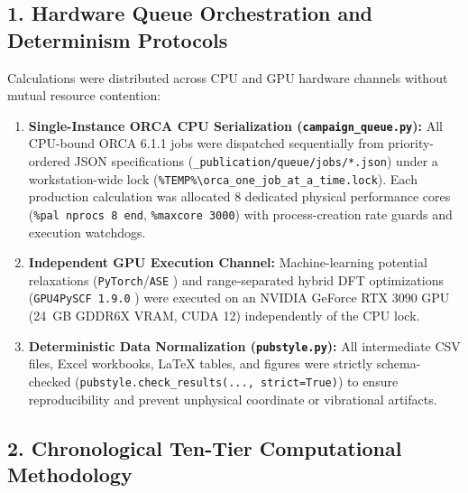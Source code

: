 \documentclass[journal=jpclcd,manuscript=article]{achemso}
\begin{document}
\subsection{1. Hardware Queue Orchestration and Determinism Protocols}
Calculations were distributed across CPU and GPU hardware channels without mutual resource contention:
\begin{enumerate}
  \item \textbf{Single-Instance ORCA CPU Serialization (\texttt{campaign\_queue.py}):} All CPU-bound ORCA 6.1.1 \cite{Neese2020, Neese2022} jobs were dispatched sequentially from priority-ordered JSON specifications (\texttt{\_publication/queue/jobs/*.json}) under a workstation-wide lock (\texttt{\%TEMP\%\textbackslash orca\_one\_job\_at\_a\_time.lock}). Each production calculation was allocated 8 dedicated physical performance cores (\texttt{\%pal nprocs 8 end}, \texttt{\%maxcore 3000}) with process-creation rate guards and execution watchdogs.
  \item \textbf{Independent GPU Execution Channel:} Machine-learning potential relaxations (\texttt{PyTorch}/\texttt{ASE} \cite{Larsen2017}) and range-separated hybrid DFT optimizations (\texttt{GPU4PySCF 1.9.0} \cite{Sun2018, Sun2020, Wu2024, Li2024}) were executed on an NVIDIA GeForce RTX 3090 GPU (24~GB GDDR6X VRAM, CUDA 12) independently of the CPU lock.
  \item \textbf{Deterministic Data Normalization (\texttt{pubstyle.py}):} All intermediate CSV files, Excel workbooks, LaTeX tables, and figures were strictly schema-checked (\texttt{pubstyle.check\_results(..., strict=True)}) to ensure reproducibility and prevent unphysical coordinate or vibrational artifacts.
\end{enumerate}

\subsection{2. Chronological Ten-Tier Computational Methodology}
\end{document}

